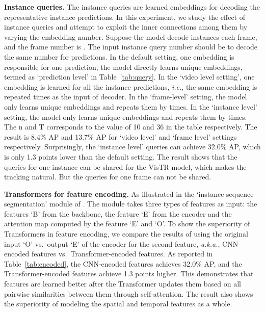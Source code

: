 \documentclass[final]{cvpr}
\def\Ours{{VisTR}\xspace}
\newcommand{\myparagraph}[1]{{\vspace{0.01cm} \noindent \bf #1}}
\begin{document}
{\myparagraph{Instance queries.}
The instance queries are learned embeddings for decoding the representative instance predictions.
In this experiment, we study the effect of instance queries and attempt to exploit the inner connections among them by varying the embedding number. Suppose the model decode  instances each frame, and the frame number is . The input instance query number should be  to decode the same number for predictions.
In the default setting, one embedding is responsible for one prediction, the model directly learns  unique embeddings, termed as `prediction level' in Table~\ref{tab:query}. 
In the `video level setting', one embedding is learned for all the instance predictions, \textit{i.e.}, the same embedding is repeated  times as the input of decoder. In the `frame-level' setting, the model only learns  unique embeddings and repeats them by  times.
In the `instance level' setting, the model only learns  unique embeddings and repeats them by  times. 
The n and T corresponds to the value of 10 and 36 in the table respectively. The result is 8.4\% AP and 13.7\% AP for `video level' and `frame level' settings respectively.
Surprisingly, the `instance level' queries can achieve 32.0\% AP, which is only 1.3 points lower than the default setting. The result shows that the queries for one instance can be shared for the \Ours model, which makes the tracking natural. But the queries for one frame can not be shared. 


\myparagraph{Transformers for feature encoding.}
As illustrated in the 
`instance sequence segmentation' module of .
The module takes three types of features as input: 
the features `B' from the backbone, the feature `E' from the encoder and the attention map computed by the feature `E' and `O'. 
To show the superiority of Transformers in feature encoding, we compare the results of using the original input `O' vs.\ output `E' of the encoder for the second feature, \textit{a.k.a.}, CNN-encoded features vs.\  Transformer-encoded features. As reported in Table~\ref{tab:encoded}, the CNN-encoded features achieves 32.0\% AP, and the Transformer-encoded features achieve 1.3 points higher. This demonstrates that features are learned better after the Transformer updates them based on all pairwise similarities between them through self-attention. The result also shows the superiority of modeling the spatial and temporal features as a whole.


}
\end{document}
